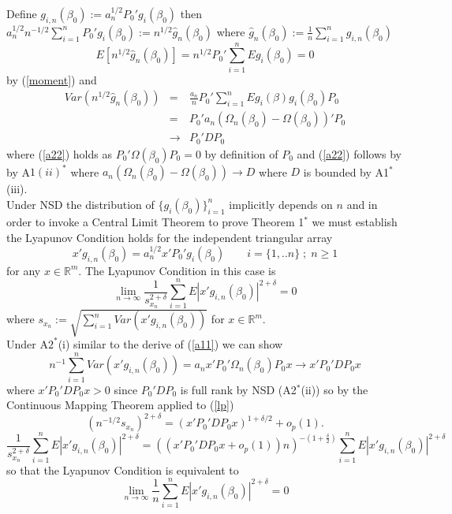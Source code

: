 \documentclass[11pt, fleqn]{article}
\begin{document}
Define   $g_{i,n}(\beta_0):=a_n^{1/2}P_0'g_i(\beta_0)$ then  $ a_n^{1/2}n^{-1/2}\sum_{i=1}^n P_0'g_i(\beta_0):=n^{1/2}\hat{g}_{n}(\beta_0)$ where  $\hat{g}_{n}(\beta_0):=\frac{1}{n}\sum_{i=1}^ng_{i,n}(\beta_0)$ 
  \begin{equation} E[n^{1/2}\hat{g}_{n}(\beta_0)]=
  n^{1/2}P_0'\sum_{i=1}^nEg_i(\beta_0)= 0\end{equation}
by (\ref{moment}) and
\begin{eqnarray} Var(n^{1/2}\hat{g}_{n}(\beta_0))
&=&\frac{a_n}{n}P_0'\sum_{i=1}^nEg_i(\beta)g_i(\beta_0)P_0 \\
&=&P_0'a_n\left(\Omega_n(\beta_0)-\Omega(\beta_0)\right)'P_0\label{a22} \\ &\rightarrow&P_0'DP_0 \label{a11}\end{eqnarray}  
where (\ref{a22}) holds as $P_0'\Omega(\beta_0) P_0=0$ by definition of $P_0$ and (\ref{a22}) follows by by A$1(ii)^*$ where $a_n\left(\Omega_n(\beta_0)-\Omega(\beta_0)\right) \rightarrow D$  where $D$ is bounded by A1$^*$(iii).\\
 Under NSD the distribution of $\{g_i(\beta_0)\}_{i=1}^n$ implicitly depends on $n$  and in order to invoke a Central Limit Theorem to prove Theorem 1$^*$ we must establish the Lyapunov Condition holds for the independent triangular array
 \begin{equation}
 x'g_{i,n}(\beta_0)= a_n^{1/2}x'P_0'g_{i}(\beta_0) \qquad i=\{1,..n\} \; ; \; n\geq 1 \end{equation}
 for any $x \in \mathbb{R}^m$. The Lyapunov Condition  in this case is
 \begin{equation}  \underset{n\rightarrow \infty}{\lim} \frac{1}{s_{x_n}^{2+\delta}} \sum_{i=1}^n E|x'g_{i,n}(\beta_0)|^{2+\delta}=0 \end{equation}
  where $s_{x_n}:=\sqrt{\sum_{i=1}^n Var(x'g_{i,n}(\beta_0))}$  for $x \in \mathbb{R}^m$.\\
 Under A$2^*$(i)   similar to the derive of (\ref{a11}) we can show
 \begin{equation}\label{lp} n^{-1}\sum_{i=1}^n Var(x'g_{i,n}(\beta_0))=a_nx'P_0'\Omega_n(\beta_0)P_0x\rightarrow x'P_0'DP_0x \end{equation} where  $x'P_0'DP_0x>0$ since $P_0'DP_0$ is full rank by NSD (A2$^*$(ii)) so by the Continuous Mapping Theorem applied to (\ref{lp})
  \begin{equation}(n^{-1/2}s_{x_n})^{2+\delta}= (x'P_0'DP_0x)^{1+\delta/2}+o_p(1).\end{equation}
   \begin{equation}\frac{1}{s_{x_n}^{2+\delta}} \sum_{i=1}^n E|x'g_{i,n}(\beta_0)|^{2+\delta}=
   \left((x'P_0'DP_0x+o_p(1))
  n\right)^{-(1+\frac{\delta}{2})}\sum_{i=1}^n E|x'g_{i,n}(\beta_0)|^{2+\delta} \end{equation} so that the Lyapunov Condition is equivalent to \begin{equation}\lim_{n\rightarrow \infty} \frac{1}{n} \sum_{i=1}^n E|x'g_{i,n}(\beta_0)|^{2+\delta}=0 \end{equation}
  
\end{document}
